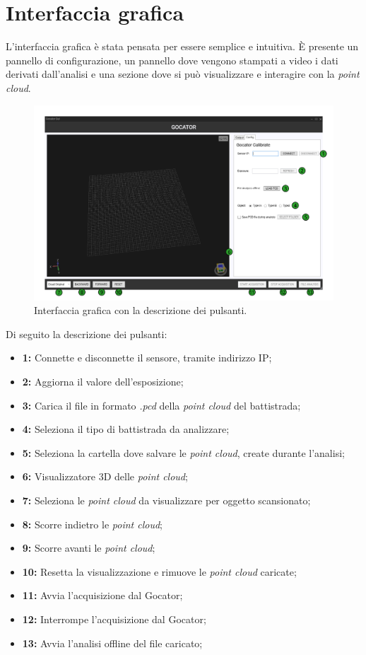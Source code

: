 \section{Interfaccia grafica}
L'interfaccia grafica è stata pensata per essere semplice e intuitiva. È presente un pannello di configurazione, un pannello dove vengono stampati a video i dati derivati dall'analisi e una sezione dove si può visualizzare e interagire con la \textit{point cloud}.

\begin{figure}[H]
	\centering
	\includegraphics[width=1.0\columnwidth]{./pictures/gui_1.png}
	\caption{Interfaccia grafica con la descrizione dei pulsanti.}\label{fig:gui_1}
\end{figure}

\noindent Di seguito la descrizione dei pulsanti:

\begin{itemize}
	\item \textbf{1:} Connette e disconnette il sensore, tramite indirizzo IP;
	\item \textbf{2:} Aggiorna il valore dell'esposizione;
	\item \textbf{3:} Carica il file in formato \textit{.pcd} della \textit{point cloud} del battistrada;
	\item \textbf{4:} Seleziona il tipo di battistrada da analizzare;
	\item \textbf{5:} Seleziona la cartella dove salvare le \textit{point cloud}, create durante l'analisi;
	\item \textbf{6:} Visualizzatore 3D delle \textit{point cloud};
	\item \textbf{7:} Seleziona le \textit{point cloud} da visualizzare per oggetto scansionato;
	\item \textbf{8:} Scorre indietro le \textit{point cloud};
	\item \textbf{9:} Scorre avanti le \textit{point cloud};
	\item \textbf{10:} Resetta la visualizzazione e rimuove le \textit{point cloud} caricate;
	\item \textbf{11:} Avvia l'acquisizione dal Gocator;
	\item \textbf{12:} Interrompe l'acquisizione dal Gocator;
	\item \textbf{13:} Avvia l'analisi offline del file caricato;
\end{itemize}

